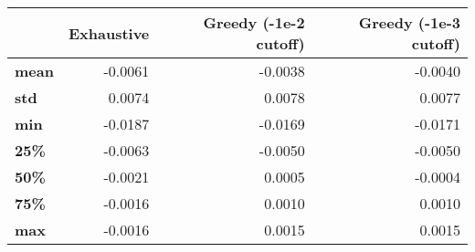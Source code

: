 \begin{tabular}{lrrr}
\toprule
{} &  Exhaustive &  Greedy (-1e-2 cutoff) &  Greedy (-1e-3 cutoff) \\
\midrule
\textbf{mean} &     -0.0061 &                -0.0038 &                -0.0040 \\
\textbf{std } &      0.0074 &                 0.0078 &                 0.0077 \\
\textbf{min } &     -0.0187 &                -0.0169 &                -0.0171 \\
\textbf{25\% } &     -0.0063 &                -0.0050 &                -0.0050 \\
\textbf{50\% } &     -0.0021 &                 0.0005 &                -0.0004 \\
\textbf{75\% } &     -0.0016 &                 0.0010 &                 0.0010 \\
\textbf{max } &     -0.0016 &                 0.0015 &                 0.0015 \\
\bottomrule
\end{tabular}
